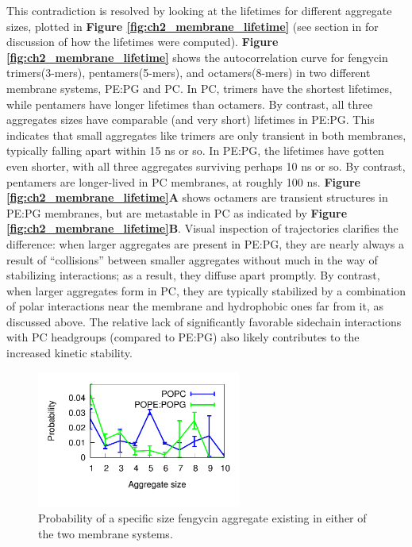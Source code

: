 This contradiction is resolved by looking at the lifetimes for
different aggregate sizes, plotted in \textbf{Figure \ref{fig:ch2_membrane_lifetime}} (see
section \textbf{} in \textbf{} for
 discussion of how the lifetimes were computed). \textbf{Figure
\ref{fig:ch2_membrane_lifetime}} shows the autocorrelation curve for
fengycin trimers(3-mers), pentamers(5-mers), and octamers(8-mers) in two different membrane systems, PE:PG and PC.
In PC, trimers have the shortest lifetimes, while
pentamers have longer lifetimes than octamers. By contrast, all three
aggregates sizes have comparable (and very short) lifetimes in PE:PG.
This indicates that small aggregates like trimers are only transient in both membranes,
typically falling apart within 15 ns or so. In PE:PG, the lifetimes have gotten even shorter, with all three aggregates
surviving perhaps 10 ns or so. By contrast, pentamers are longer-lived in PC
membranes, at roughly 100 ns. \textbf{Figure \ref{fig:ch2_membrane_lifetime}A} shows octamers
 are transient structures in PE:PG membranes, but are
metastable in PC as indicated by \textbf{Figure \ref{fig:ch2_membrane_lifetime}B}.
Visual inspection of trajectories clarifies the difference:
when larger aggregates are present in PE:PG, they are nearly always a result of
``collisions'' between smaller aggregates without much in the way of stabilizing
interactions; as a result, they diffuse apart promptly. By contrast, when
larger aggregates form in PC, they are typically stabilized by a combination of
polar interactions near the membrane and hydrophobic ones far from it, as
discussed above. The relative lack of significantly favorable sidechain
interactions with PC headgroups (compared to PE:PG) also likely contributes to
the increased kinetic stability.

\begin{figure}
\centering
\includegraphics[width=0.6\textwidth]{chapter2_figs/clusters.pdf}
\caption{\label{fig:ch2_cluster_pop} Probability of a specific size fengycin aggregate existing in either of the two membrane systems.}
\end{figure}

